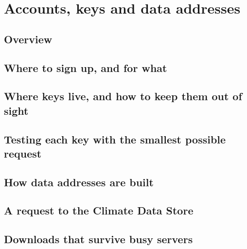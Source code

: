\chapter{Accounts, keys and data addresses}\label{ch:access}

\section{Overview}


\section{Where to sign up, and for what}


\section{Where keys live, and how to keep them out of sight}


\section{Testing each key with the smallest possible request}


\section{How data addresses are built}


\section{A request to the Climate Data Store}


\section{Downloads that survive busy servers}


